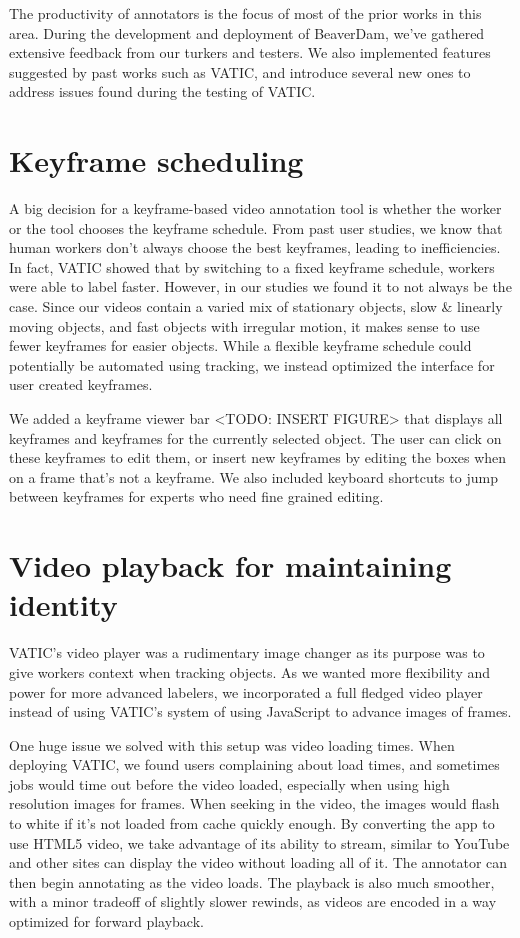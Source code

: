 
The productivity of annotators is the focus of most of the prior works in this area.
During the development and deployment of BeaverDam, we've gathered extensive feedback from our turkers and testers.
We also implemented features suggested by past works such as VATIC,
and introduce several new ones to address issues found during the testing of VATIC.

\section{Keyframe scheduling}

A big decision for a keyframe-based video annotation tool is whether the worker or the tool chooses the keyframe schedule.
From past user studies, we know that human workers don't always choose the best keyframes, leading to inefficiencies.
In fact, VATIC showed that by switching to a fixed keyframe schedule, workers were able to label faster.
However, in our studies we found it to not always be the case.
Since our videos contain a varied mix of stationary objects, slow \& linearly moving objects, and fast objects with irregular motion, it makes sense to use fewer keyframes for easier objects.
While a flexible keyframe schedule could potentially be automated using tracking, we instead optimized the interface for user created keyframes.

We added a keyframe viewer bar <TODO: INSERT FIGURE> that displays all keyframes and keyframes for the currently selected object.
The user can click on these keyframes to edit them, or insert new keyframes by editing the boxes when on a frame that's not a keyframe.
We also included keyboard shortcuts to jump between keyframes for experts who need fine grained editing.

\section{Video playback for maintaining identity}

VATIC's video player was a rudimentary image changer as its purpose was to give workers context when tracking objects.
As we wanted more flexibility and power for more advanced labelers, we incorporated a full fledged video player instead of using VATIC's system of using JavaScript to advance images of frames.

One huge issue we solved with this setup was video loading times.
When deploying VATIC, we found users complaining about load times, and sometimes jobs would time out before the video loaded, especially when using high resolution images for frames.
When seeking in the video, the images would flash to white if it's not loaded from cache quickly enough.
By converting the app to use HTML5 video, we take advantage of its ability to stream, similar to YouTube and other sites can display the video without loading all of it.
The annotator can then begin annotating as the video loads.
The playback is also much smoother, with a minor tradeoff of slightly slower rewinds, as videos are encoded in a way optimized for forward playback.

